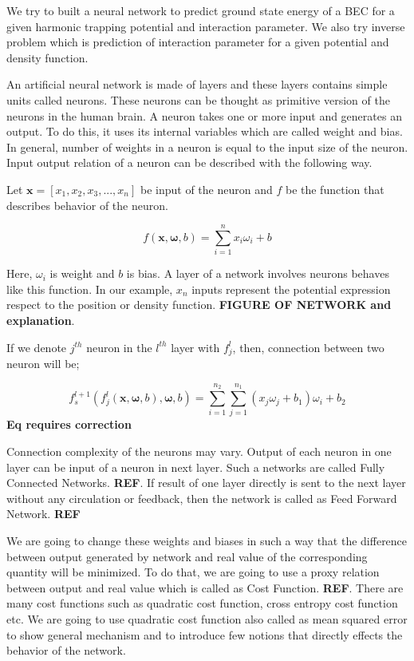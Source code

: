 \documentclass[a4paper,times,12pt]{article}
\begin{document}
We try to built a neural network to predict ground state energy of a BEC for a given harmonic trapping potential and interaction parameter. We also try inverse problem which is prediction of interaction parameter for a given potential and density function. 


An artificial neural network is made of layers and these layers contains simple units called neurons. These neurons can be thought as primitive version of the neurons in the human brain. A neuron takes one or more input and generates an output. To do this, it uses its internal variables which are called weight and bias. In general, number of weights in a neuron is equal to the input size of the neuron. Input output relation of a neuron can be described with the following way. 

Let $\boldsymbol{x} = [x_1, x_2, x_3, ..., x_n]$ be input of the neuron and $f$ be the function that describes behavior of the neuron. 

\begin{equation}
\label{eq:NU_neuron}
f(\boldsymbol{x}, \boldsymbol{\omega}, b) = \sum\limits_{i = 1}^n x_i\omega_i + b
\end{equation}

Here, $\omega_i$ is weight and $b$ is bias. A layer of a network involves neurons behaves like this function. In our example, $x_n$ inputs represent the potential expression respect to the position or density function. \textbf{FIGURE OF NETWORK and explanation}. 

If we denote $j^{th}$ neuron in the $l^{th}$ layer with $f_j^l$, then, connection between two neuron will be;

\begin{equation}
\label{eq:NU_neuron_connection}
f_s^{l+1}(f_j^{l}(\boldsymbol{x}, \boldsymbol{\omega}, b), \boldsymbol{\omega}, b) = \sum\limits_{i=1}^{n_2} \sum\limits_{j=1}^{n_1} (x_j\omega_j + b_1)\omega_i + b_2
\end{equation}
\textbf{Eq requires correction}

Connection complexity of the neurons may vary. Output of each neuron in one layer can be input of a neuron in next layer. Such a networks are called Fully Connected Networks. \textbf{REF}. If result of one layer directly is sent to the next layer without any circulation or feedback, then the network is called as Feed Forward Network. \textbf{REF}

We are going to change these weights and biases in such a way that the difference between output generated by network and real value of the corresponding quantity will be minimized. To do that, we are going to use a proxy relation between output and real value which is called as Cost Function. \textbf{REF}. There are many cost functions such as quadratic cost function, cross entropy cost function etc. We are going to use quadratic cost function also called as mean squared error to show general mechanism and to introduce few notions that directly effects the behavior of the network. 
\end{document}
